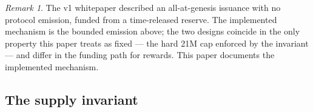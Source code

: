 \documentclass[11pt]{article}
\newcommand{\statusI}{\textcolor{statgreen}{\textsf{\scriptsize[IMPLEMENTED]}}}
\theoremstyle{plain}
\theoremstyle{definition}
\theoremstyle{remark}
\newtheorem{remark}[theorem]{Remark}
\begin{document}
\begin{table}[ht]\centering
{}
\caption{Emission schedule. Emission is flat at $210{,}000$ SOS/yr until the
$18{,}900{,}000$ SOS pool is exhausted at $\approx$ year $90$, when the final
epoch is truncated to land exactly on the $21{,}000{,}000$ SOS cap and issuance
ceases permanently. \statusI{}}
\label{tab:emission}
\end{table}

\begin{remark}
The v1 whitepaper described an all-at-genesis issuance with no protocol
emission, funded from a time-released reserve. The implemented mechanism is
the bounded emission above; the two designs coincide in the only property
this paper treats as fixed --- the hard 21M cap enforced by the invariant ---
and differ in the funding path for rewards. This paper documents the
implemented mechanism.
\end{remark}

\subsection{The supply invariant}
\label{sec:invariant}
\end{document}
